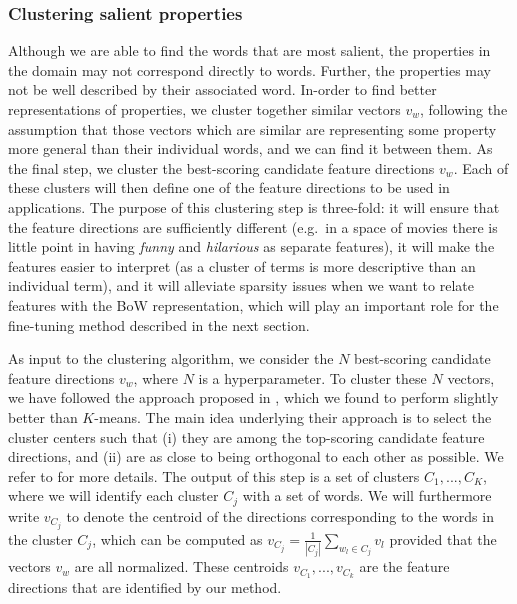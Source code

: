 \subsubsection{Clustering salient properties}
Although we are able to find the words that are most salient, the properties in the domain may not correspond directly to words. Further, the properties may not be well described by their associated word. In-order to find better representations of properties, we cluster together similar vectors $v_w$, following the assumption that those vectors which are similar are representing some property more general than their individual words, and we can find it between them.
As the final step, we cluster the best-scoring candidate feature directions $v_w$. Each of these clusters will then define one of the feature directions to be used in applications. The purpose of this clustering step is three-fold: it will ensure that the feature directions are sufficiently different (e.g.\ in a space of movies there is little point in having \emph{funny} and \emph{hilarious} as separate features), it will make the features easier to interpret (as a cluster of terms is more descriptive than an individual term), and it will alleviate sparsity issues when we want to relate features with the BoW representation, which will play an important role for the fine-tuning method described in the next section.

As input to the clustering algorithm, we consider the $N$ best-scoring candidate feature directions $v_w$, where $N$ is a hyperparameter. To cluster these $N$ vectors, we have followed the approach proposed in \cite{derracAIJ}, which we found to perform slightly better than $K$-means. The main idea underlying their approach is to select the cluster centers such that (i) they are among the top-scoring candidate feature directions, and (ii) are as close to being orthogonal to each other as possible. We refer to \cite{derracAIJ} for more details. 
The output of this step is a set of clusters $C_1,...,C_K$, where we will identify each cluster $C_j$ with a set of words.
We will furthermore write $v_{C_j}$ to denote the centroid of the directions corresponding to the words in the cluster $C_j$, which can be computed as $v_{C_j}= \frac{1}{|C_j|} \sum_{w_l\in C_j} v_l$ provided that the vectors $v_w$ are all normalized. These centroids $v_{C_1},...,v_{C_k}$ are the feature directions that are identified by our method. 

